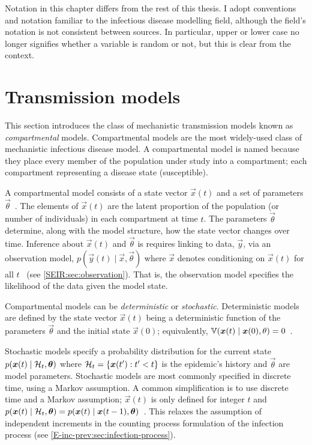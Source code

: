 \documentclass[thesis.tex]{subfiles}
\begin{document}
Notation in this chapter differs from the rest of this thesis.
I adopt conventions and notation familiar to the infectious disease modelling field, although the field's notation is not consistent between sources.
In particular, upper or lower case no longer signifies whether a variable is random or not, but this is clear from the context.

\section{Transmission models} \label{SEIR:sec:transmission-generic}

This section introduces the class of mechanistic transmission models known as \emph{compartmental} models.
Compartmental models are the most widely-used class of mechanistic infectious disease model.
A compartmental model is named because they place every member of the population under study into a compartment; each compartment representing a disease state (\eg susceptible).

A compartmental model consists of a state vector $\vec{x}(t)$ and a set of parameters $\vec{\theta}$~\autocite{birrellEvidence}.
The elements of $\vec{x}(t)$ are the latent proportion of the population (or number of individuals) in each compartment at time $t$.
The parameters $\vec{\theta}$ determine, along with the model structure, how the state vector changes over time.
Inference about $\vec{x}(t)$ and $\vec{\theta}$ is requires linking to data, $\vec{y}$, via an observation model, $p(\vec{y}(t) \mid \vec{x}, \vec{\theta})$ where $\vec{x}$ denotes conditioning on $\vec{x}(t)$ for all $t$~\autocite{birrellEvidence} (see \cref{SEIR:sec:observation}).
That is, the observation model specifies the likelihood of the data given the model state.

Compartmental models can be \emph{deterministic} or \emph{stochastic}.
Deterministic models are defined by the state vector $\vec{x}(t)$ being a deterministic function of the parameters $\vec{\theta}$ and the initial state $\vec{x}(0)$; equivalently, $\operatorname{\mathbb{V}}(\bm{x}(t) \mid \bm{x}(0), \theta) = 0$~\autocite{birrellEvidence}.

Stochastic models specify a probability distribution for the current state $p(\bm{x}(t) \mid \mathcal{H}_t, \bm{\theta})$ where $\mathcal{H}_t = \{ \bm{x}(t') : t' < t \}$ is the epidemic's history and $\vec{\theta}$ are model parameters.
Stochastic models are most commonly specified in discrete time, using a Markov assumption.
A common simplification is to use discrete time and a Markov assumption; \ie $\vec{x}(t)$ is only defined for integer $t$ and $p(\bm{x}(t) \mid \mathcal{H}_t, \bm{\theta}) = p(\bm{x}(t) \mid \bm{x}(t-1), \bm{\theta})$~\autocite{birrellEvidence}.
This relaxes the assumption of independent increments in the counting process formulation of the infection process (see \cref{E-inc-prev:sec:infection-process}).
\end{document}
